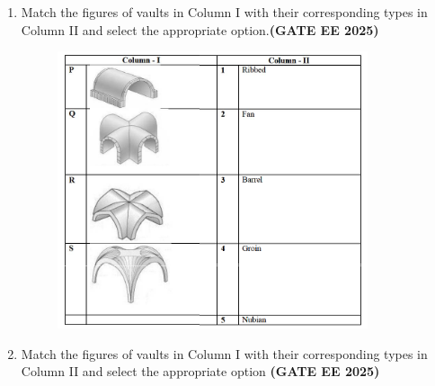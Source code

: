 \documentclass[journal,12pt,onecolumn]{IEEEtran}
\theoremstyle{remark}
\begin{document}
\begin{enumerate}
\begin{tabular}{|c|c|c|c|}
 \end{tabular}
 \begin{enumerate}
 \end{enumerate}
 \item Match the figures of vaults in Column I with their corresponding types in Column II and select the appropriate option.\hfill \textbf{(GATE EE 2025)}\\
 \begin{figure}[h]
     \centering
     \includegraphics[width=0.5\linewidth]{figs/fig3.png}
     \caption{}
     \label{fig3}
 \end{figure}
 \begin{enumerate}
 \end{enumerate}
 \item Match the figures of vaults in Column I with their corresponding types in Column II and select the appropriate option \hfill \textbf{(GATE EE 2025)}\\
 \begin{enumerate}
\end{enumerate}
\end{enumerate}
\end{document}

